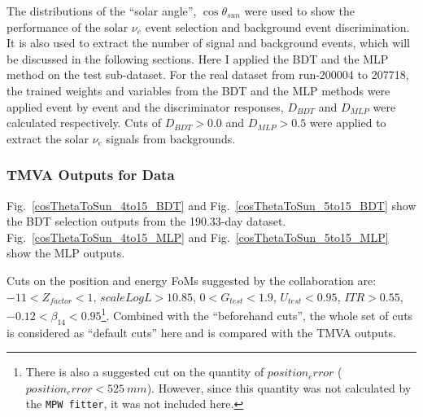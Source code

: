 The distributions of the ``solar angle'', $\cos\theta_{sun}$ were used to show the performance of the solar $\nu_e$ event selection and background event discrimination. It is also used to extract the number of signal and background events, which will be discussed in the following sections. Here I applied the BDT and the MLP method on the test sub-dataset. For the real dataset from run-200004 to 207718, the trained weights and variables from the BDT and the MLP methods were applied event by event and the discriminator responses, $D_{BDT}$ and $D_{MLP}$ were calculated respectively. Cuts of $D_{BDT}>0.0$ and $D_{MLP}>0.5$ were applied to extract the solar $\nu_e$ signals from backgrounds. 
 

%

\subsubsection{TMVA Outputs for Data}

Fig.~\ref{cosThetaToSun_4to15_BDT} and Fig.~\ref{cosThetaToSun_5to15_BDT} show the BDT selection outputs from the 190.33-day dataset. Fig.~\ref{cosThetaToSun_4to15_MLP} and Fig.~\ref{cosThetaToSun_5to15_MLP} show the MLP outputs. 


Cuts on the position and energy FoMs suggested by the collaboration\cite{morganFOM} are: $-11<Z_{factor}<1$, $scaleLogL>10.85$, $0<G_{test}<1.9$, $U_{test}<0.95$, $ITR>0.55$, $-0.12<\beta_{14}<0.95$\footnote{There is also a suggested cut on the quantity of $position_error$ ($position_error<525~mm$). However, since this quantity was not calculated by the \texttt{MPW fitter}, it was not included here.}. Combined with the ``beforehand cuts'', the whole set of cuts is considered as ``default cuts'' here and is compared with the TMVA outputs.

